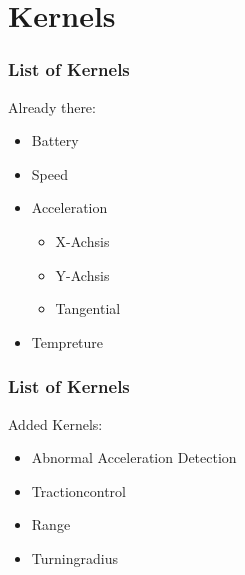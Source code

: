 \documentclass{beamer}
\begin{document}
\section{Kernels}
\begin{frame} %
  \frametitle{List of Kernels} %
  Already there:
  \begin{itemize}
   \item Battery
   \item Speed
   \item Acceleration
   \begin{itemize}
    \item X-Achsis
    \item Y-Achsis
    \item Tangential
   \end{itemize}
   \item Tempreture
  \end{itemize}
\end{frame}
\begin{frame}
    \frametitle{List of Kernels}
    Added Kernels:
    \begin{itemize}
     \item Abnormal Acceleration Detection
     \item Tractioncontrol
     \item Range
     \item Turningradius
    \end{itemize}
\end{frame}
\end{document}
